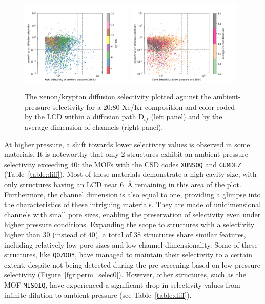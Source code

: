 \documentclass[main]{subfiles}
\begin{document}
\begin{figure}[ht]
  \centering
    \includegraphics[width=0.48\textwidth]{figures/5-diffusion/diff_D_xekr-s2080-lcd.pdf}
    \includegraphics[width=0.48\textwidth]{figures/5-diffusion/diff_D_xekr-s2080-chandim.pdf}
    \caption{The xenon/krypton diffusion selectivity plotted against the ambient-pressure selectivity for a 20:80 Xe/Kr composition and color-coded by the LCD within a diffusion path D$_{if}$ (left panel) and by the average dimension of channels (right panel). }\label{fgr:perm_selec2080}
\end{figure}


At higher pressure, a shift towards lower selectivity values is observed in some materials. It is noteworthy that only 2 structures exhibit an ambient-pressure selectivity exceeding $40$: the MOFs with the CSD codes \texttt{XUNSOQ}\autocite{Abrahams_2014} and \texttt{GUMDEZ}\autocite{Yin_2014} (Table~\ref{table:diff}). Most of these materials demonstrate a high cavity size, with only structures having an LCD near \SI{6}{\angstrom} remaining in this area of the plot. Furthermore, the channel dimension is also equal to one, providing a glimpse into the characteristics of these intriguing materials. They are made of unidimensional channels with small pore sizes, enabling the preservation of selectivity even under higher pressure conditions. Expanding the scope to structures with a selectivity higher than $30$ (instead of $40$), a total of 38 structures share similar features, including relatively low pore sizes and low channel dimensionality. Some of these structures, like \texttt{QOZDOY}\autocite{Zhang_2001}, have managed to maintain their selectivity to a certain extent, despite not being detected during the pre-screening based on low-pressure selectivity (Figure~\ref{fgr:perm_selec0}). However, other structures, such as the MOF \texttt{MISQIQ}\autocite{Tong_2013}, have experienced a significant drop in selectivity values from infinite dilution to ambient pressure (see Table~\ref{table:diff}).
\end{document}
